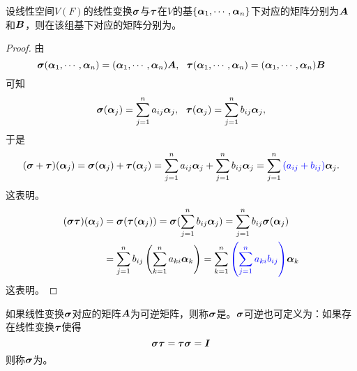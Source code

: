 \begin{frame}
  \begin{dingli}
    设线性空间$V(F)$的线性变换$\sigmabd$与$\taubd$在$V$的基$\{\alphabd_1,\cd,\alphabd_n\}$下对应的矩阵分别为$\MA$和$\MB$，则在该组基下对应的矩阵分别为。
  \end{dingli}
  \vspace{.1in}\pause 

  \begin{proof}
    由
    $$
    \sigmabd(\alphabd_1,\cd,\alphabd_n)=(\alphabd_1,\cd,\alphabd_n)\MA, ~~
    \taubd(\alphabd_1,\cd,\alphabd_n)=(\alphabd_1,\cd,\alphabd_n)\MB
    $$
    可知
    $$
    \sigmabd(\alphabd_j)=\sum_{j=1}^na_{ij}\alphabd_j, ~~
    \taubd(\alphabd_j)=\sum_{j=1}^nb_{ij}\alphabd_j,
    $$
    于是
    $$
    (\sigmabd+\taubd)(\alphabd_j)=\sigmabd(\alphabd_j)+\taubd(\alphabd_j)
    =\sum_{j=1}^na_{ij}\alphabd_j+\sum_{j=1}^nb_{ij}\alphabd_j
    =\sum_{j=1}^n\blue{(a_{ij}+b_{ij})}\alphabd_j.
    $$
    这表明。
    $$
    \begin{aligned}
      (\sigmabd \taubd)(\alphabd_j)&=\sigmabd(\taubd(\alphabd_j))
      =\sigmabd(\sum_{j=1}^nb_{ij}\alphabd_j)
      =\sum_{j=1}^nb_{ij}\sigmabd(\alphabd_j)\\
      &=\sum_{j=1}^nb_{ij}\left(\sum_{k=1}^na_{ki}\alphabd_k\right)=\sum_{k=1}^n\blue{\left(\sum_{j=1}^na_{ki}b_{ij}\right)}\alphabd_k
    \end{aligned}
    $$
    这表明。
  \end{proof}
\end{frame}

\begin{frame}
  \begin{dingyi}
    如果线性变换$\sigmabd$对应的矩阵$\MA$为可逆矩阵，则称$\sigmabd$是。$\sigmabd$可逆也可定义为：如果存在线性变换$\taubd$使得
    $$
    \sigmabd\taubd=\taubd\sigmabd=\MI
    $$
    则称$\sigmabd$为。
  \end{dingyi}
\end{frame}




